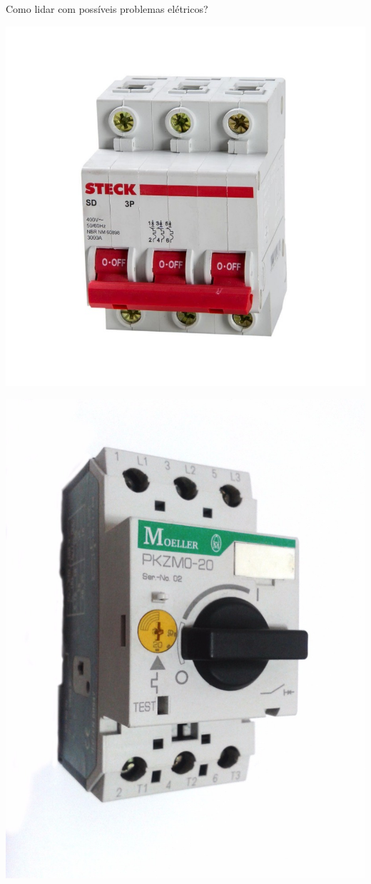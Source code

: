 \begin{frame}{Como lidar com possíveis problemas elétricos?}
	\begin{minipage}{0.45\linewidth}
		\centering
		\includegraphics[width=\linewidth]{Figuras/Ch05/fig13.jpg}
	\end{minipage}
	\hfill
	\begin{minipage}{0.45\linewidth}
		\centering
		\includegraphics[width=\linewidth]{Figuras/Ch05/fig14.jpg}

\end{minipage}
\end{frame}
